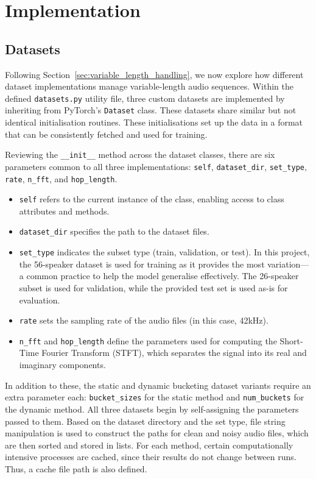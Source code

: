 \graphicspath{{content/chapters/6_implementation/figures/}}
\chapter{Implementation}
\label{chp:implementation}

\section{Datasets}
\label{sec:datasets}

Following Section~\ref{sec:variable_length_handling}, we now explore how different dataset implementations manage variable-length audio sequences. Within the defined \texttt{datasets.py} utility file, three custom datasets are implemented by inheriting from PyTorch’s \texttt{Dataset} class. These datasets share similar but not identical initialisation routines. These initialisations set up the data in a format that can be consistently fetched and used for training.

Reviewing the \texttt{\_\_init\_\_} method across the dataset classes, there are six parameters common to all three implementations: \texttt{self}, \texttt{dataset\_dir}, \texttt{set\_type}, \texttt{rate}, \texttt{n\_fft}, and \texttt{hop\_length}.

\begin{itemize}
\item \texttt{self} refers to the current instance of the class, enabling access to class attributes and methods.
\item \texttt{dataset\_dir} specifies the path to the dataset files.
\item \texttt{set\_type} indicates the subset type (train, validation, or test). In this project, the 56-speaker dataset is used for training as it provides the most variation—a common practice to help the model generalise effectively. The 26-speaker subset is used for validation, while the provided test set is used as-is for evaluation.
\item \texttt{rate} sets the sampling rate of the audio files (in this case, 42kHz).
\item \texttt{n\_fft} and \texttt{hop\_length} define the parameters used for computing the Short-Time Fourier Transform (STFT), which separates the signal into its real and imaginary components.
\end{itemize}

In addition to these, the static and dynamic bucketing dataset variants require an extra parameter each: \texttt{bucket\_sizes} for the static method and \texttt{num\_buckets} for the dynamic method. All three datasets begin by self-assigning the parameters passed to them. Based on the dataset directory and the set type, file string manipulation is used to construct the paths for clean and noisy audio files, which are then sorted and stored in lists. For each method, certain computationally intensive processes are cached, since their results do not change between runs. Thus, a cache file path is also defined.

